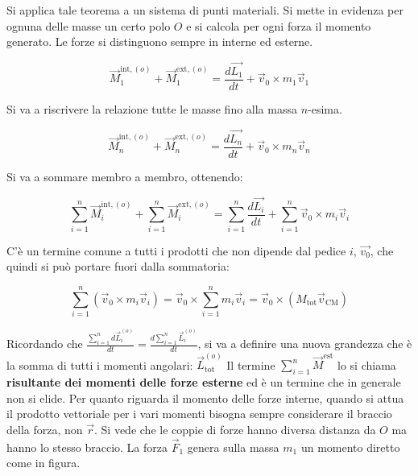 \begin{figure}[htpb]
\end{figure}
\FloatBarrier
Si applica tale teorema a un sistema di punti materiali. Si mette in evidenza per ognuna delle masse un certo polo $O$ e si calcola per ogni forza il momento generato. Le forze si distinguono sempre in interne ed esterne.

\[
	\vec{M}_1^{\text{int}, (o)}+\vec{M}_1^{\text{ext}, (o)}=\frac{d\vec{L_1}}{dt}+\vec{v}_0\times m_1\vec{v}_1
\]

Si va a riscrivere la relazione tutte le masse fino alla massa $n$-esima.

\[
	\vec{M}_n^{\text{int}, (o)}+\vec{M}_n^{\text{ext}, (o)}=\frac{d\vec{L_n}}{dt}+\vec{v}_0\times m_n\vec{v}_n
\]

Si va a sommare membro a membro, ottenendo:

\[
	\sum_{i=1}^n \vec{M}_i^{\text{int}, (o)}+\sum_{i=1}^n \vec{M}_i^{\text{ext}, (o)}=\sum_{i=1}^n \frac{d\vec{L_i}}{dt}+\sum_{i=1}^n \vec{v}_0\times m_i\vec{v}_i
\]

C'è un termine comune a tutti i prodotti che non dipende dal pedice $i$, $\vec{v_0}$, che quindi si può portare fuori dalla sommatoria:

\begin{equation}
	\label{ciao}
	\sum_{i=1}^n(\vec{v}_0\times m_i\vec{v}_i)=\vec{v}_0 \times \sum_{i=1}^nm_i\vec{v}_i=\vec{v}_0\times (M_\text{tot}\vec{v}_\text{CM})
\end{equation}

Ricordando che $\frac{\sum_{i=1}^nd\vec{L}_i^{(o)}}{dt}=\frac{d\sum_{i=1}^n \vec{L}_i^{(o)}}{dt}$, si va a definire una nuova grandezza che è la somma di tutti i momenti angolari: $\vec{L}_\text{tot}^{(o)}$
Il termine $\sum_{i=1}^n \vec{M}^\text{est}$ lo si chiama \textbf{risultante dei momenti delle forze esterne} ed è un termine che in generale non si elide. Per quanto riguarda il momento delle forze interne, quando si attua il prodotto vettoriale per i vari momenti bisogna sempre considerare il braccio della forza, non $\vec{r}$. Si vede che le coppie di forze hanno diversa distanza da $O$ ma hanno lo stesso braccio. La forza $\vec{F}_1$ genera sulla massa $m_1$ un momento diretto come in figura.

